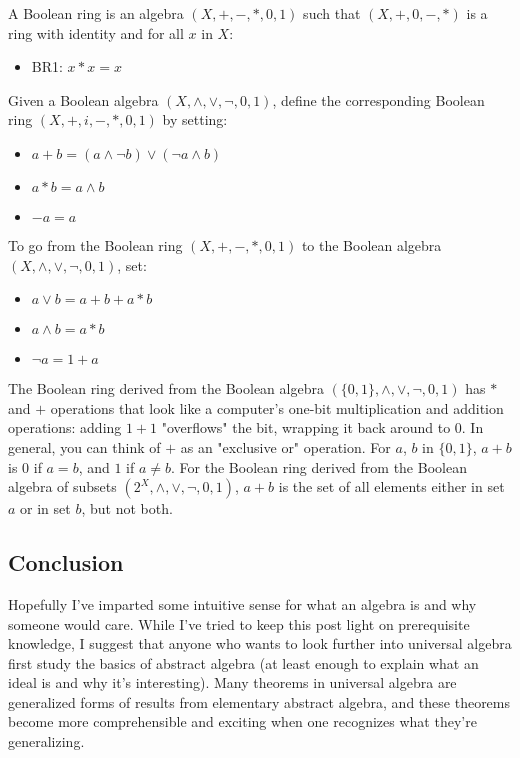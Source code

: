 \documentclass{article}
\begin{document}
\begin{itemize}
{\begin{itemize}
\begin{itemize}
A Boolean ring is an algebra $ (X, +, -, \ast, 0, 1)$ such that $ (X, +, 0, -, \ast)$ is a ring with identity and for all $ x$ in $ X$:

\begin{itemize}
\item{BR1: $ x \ast x = x$}
\end{itemize}

Given a Boolean algebra $ (X, \land, \lor, \neg, 0, 1)$, define the corresponding Boolean ring $ (X, +, i, -, \ast, 0, 1)$ by setting:

\begin{itemize}
\item{$ a + b = (a \land \neg b) \lor (\neg a \land b)$}
\item{$ a \ast b = a \land b$}
\item{$  -a = a$}
\end{itemize}

To go from the Boolean ring $ (X, +, -, \ast, 0, 1)$ to the Boolean algebra $ (X, \land, \lor, \neg, 0, 1)$, set:

\begin{itemize}
\item{$ a \lor b = a + b + a \ast b$}
\item{$ a \land b = a \ast b$}
\item{$ \neg a = 1 + a$}
\end{itemize}

The Boolean ring derived from the Boolean algebra $ (\{0, 1\}, \land, \lor, \neg, 0, 1)$ has $ \ast$ and $ +$ operations that look like a computer's one-bit multiplication and addition operations: adding $ 1 + 1$ "overflows" the bit, wrapping it back around to $ 0$. In general, you can think of $ +$ as an "exclusive or" operation. For $ a$, $ b$ in $ \{0, 1\}$, $ a + b$ is $ 0$ if $ a = b$, and $ 1$ if $ a \neq b$. For the Boolean ring derived from the Boolean algebra of subsets $ (2^X, \land, \lor, \neg, 0, 1)$, $ a + b$ is the set of all elements either in set $ a$ or in set $ b$, but not both.

\subsection{Conclusion}

Hopefully I've imparted some intuitive sense for what an algebra is and why someone would care. While I've tried to keep this post light on prerequisite knowledge, I suggest that anyone who wants to look further into universal algebra first study the basics of abstract algebra (at least enough to explain what an ideal is and why it's interesting). Many theorems in universal algebra are generalized forms of results from elementary abstract algebra, and these theorems become more comprehensible and exciting when one recognizes what they're generalizing. 


\end{itemize}
\end{itemize}}
\end{itemize}
\end{document}
